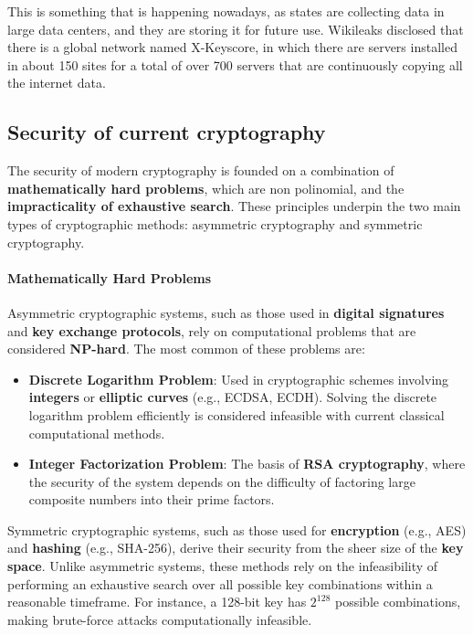 This is something that is happening nowadays, as states are collecting
data in large data centers, and they are storing it for future use.
Wikileaks disclosed that there is a global network named X-Keyscore,
in which there are servers installed in about 150 sites for a total of
over 700 servers that are continuously copying all the internet data.

\subsection{Security of current cryptography}
The security of modern cryptography is founded on a combination of
\textbf{mathematically hard problems}, which are non polinomial, and
the \textbf{impracticality of exhaustive search}. These principles
underpin the two main types of cryptographic methods: asymmetric
cryptography and symmetric cryptography.

\paragraph{Mathematically Hard Problems}  
Asymmetric cryptographic systems, such as those used in
\textbf{digital signatures} and \textbf{key exchange protocols}, rely
on computational problems that are considered \textbf{NP-hard}. The
most common of these problems are:  
\begin{itemize}
  \item \textbf{Discrete Logarithm Problem}: Used in cryptographic
    schemes involving \textbf{integers} or \textbf{elliptic curves}
    (e.g., ECDSA, ECDH). Solving the discrete logarithm problem
    efficiently is considered infeasible with current classical
    computational methods.  
  \item \textbf{Integer Factorization Problem}: The basis of
    \textbf{RSA cryptography}, where the security of the system
    depends on the difficulty of factoring large composite numbers
    into their prime factors.  
\end{itemize}

Symmetric cryptographic systems, such as those used for
\textbf{encryption} (e.g., AES) and \textbf{hashing} (e.g., SHA-256),
derive their security from the sheer size of the \textbf{key space}.
Unlike asymmetric systems, these methods rely on the infeasibility of
performing an exhaustive search over all possible key combinations
within a reasonable timeframe. For instance, a 128-bit key has
$2^{128}$ possible combinations, making brute-force attacks
computationally infeasible.  


